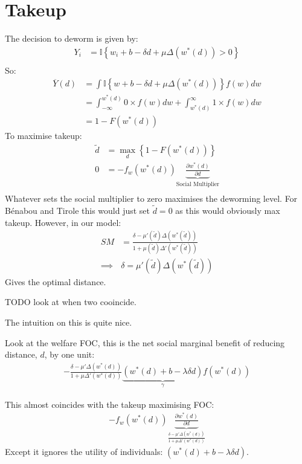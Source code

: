 \documentclass{article}
\begin{document}
\section{Takeup}
The decision to deworm is given by:
\begin{align*}
    Y_i &= \mathbb{I}\left\{w_i + b - \delta d + \mu \Delta(w^*(d)) > 0 \right\} \\
\end{align*}
So:
\begin{align*}
    \overline{Y}(d) &= \int \mathbb{I}\left\{w + b - \delta d + \mu \Delta(w^*(d)) \right\} f(w) dw \\
    &=  \int^{w^*(d)}_{-\infty} 0 \times f(w) dw + \int^{\infty}_{w^*(d)} 1 \times f(w) dw \\
    &= 1 - F(w^*(d)) 
\end{align*}
To maximise takeup:
\begin{align*}
    \tilde{d} &= \max_d \left\{1 - F(w^*(d)) \right\} \\
  0 &=    -f_w(w^*(d)) \underbrace{\frac{\partial w^*(d)}{\partial d}}_{\textrm{Social Multiplier}}  \\
\end{align*}
Whatever sets the social multiplier to zero maximises the deworming level. For 
B\'enabou and Tirole this would just set $\tilde{d} = 0$ as this would obviously max 
takeup. However, in our model:
\begin{align*}
    SM &= \frac{\delta - \mu'(\tilde{d}) \Delta(w^*(\tilde{d}))}{1 + \mu(\tilde{d}) \Delta'(w^*(\tilde{d}))}  \\
    \implies & \delta = \mu'(\tilde{d}) \Delta(w^*(\tilde{d})) 
\end{align*}
Gives the optimal distance.

TODO look at when two cooincide.

The intuition on this is quite nice. 


Look at the welfare FOC, this is the net social marginal benefit of reducing distance, $d$, by one unit: 
\begin{align*}
- \frac{\delta - \mu' \Delta(w^*(d))}{1 + \mu \Delta'(w^*(d))} \underbrace{(w^*(d) + b - \lambda \delta d)}_{\gamma}f(w^*(d))
\end{align*}

This almost coincides with the takeup maximising FOC:
\begin{align*}
 -f_w(w^*(d)) \underbrace{\frac{\partial w^*(d)}{\partial d}}_{\frac{\delta - \mu' \Delta(w^*(d))}{1 + \mu \Delta'(w^*(d))}} 
\end{align*}
Except it ignores the utility of individuals: $(w^*(d) + b - \lambda \delta d)$. 
\end{document}
